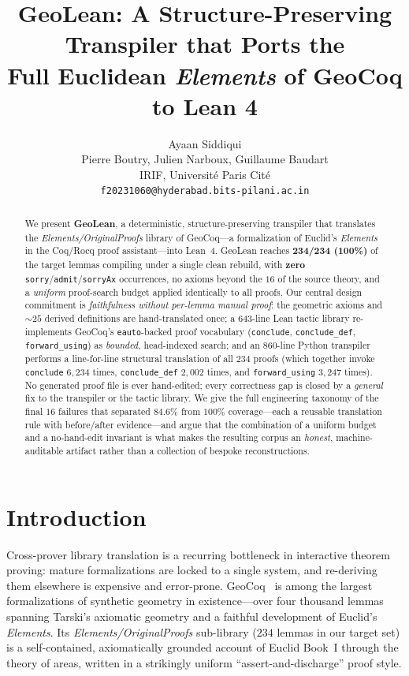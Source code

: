 \documentclass{article}
\title{GeoLean: A Structure-Preserving Transpiler that Ports the\\
Full Euclidean \emph{Elements} of GeoCoq to Lean 4}
\author{
  Ayaan Siddiqui \\
  Pierre Boutry, Julien Narboux, Guillaume Baudart \\
  IRIF, Universit\'e Paris Cit\'e \\
  \texttt{f20231060@hyderabad.bits-pilani.ac.in}
}
\begin{document}
\maketitle

\begin{abstract}
We present \textbf{GeoLean}, a deterministic, structure-preserving transpiler that translates
the \emph{Elements/OriginalProofs} library of GeoCoq---a formalization of Euclid's
\emph{Elements} in the Coq/Rocq proof assistant---into Lean~4. GeoLean reaches
\textbf{234/234 (100\%)} of the target lemmas compiling under a single clean rebuild, with
\textbf{zero} \texttt{sorry}/\texttt{admit}/\texttt{sorryAx} occurrences, no axioms beyond the
$16$ of the source theory, and a \emph{uniform} proof-search budget applied identically to all
proofs. Our central design commitment is \emph{faithfulness without per-lemma manual proof}:
the geometric axioms and ${\sim}25$ derived definitions are hand-translated once; a 643-line
Lean tactic library re-implements GeoCoq's \texttt{eauto}-backed proof vocabulary
(\texttt{conclude}, \texttt{conclude\_def}, \texttt{forward\_using}) as \emph{bounded},
head-indexed search; and an 860-line Python transpiler performs a line-for-line structural
translation of all $234$ proofs (which together invoke \texttt{conclude} $6{,}234$ times,
\texttt{conclude\_def} $2{,}002$ times, and \texttt{forward\_using} $3{,}247$ times). No
generated proof file is ever hand-edited; every correctness gap is closed by a \emph{general}
fix to the transpiler or the tactic library. We give the full engineering taxonomy of the
final $16$ failures that separated $84.6\%$ from $100\%$ coverage---each a reusable
translation rule with before/after evidence---and argue that the combination of a uniform
budget and a no-hand-edit invariant is what makes the resulting corpus an \emph{honest},
machine-auditable artifact rather than a collection of bespoke reconstructions.
\end{abstract}

\section{Introduction}

Cross-prover library translation is a recurring bottleneck in interactive theorem proving:
mature formalizations are locked to a single system, and re-deriving them elsewhere is
expensive and error-prone. GeoCoq~\citep{geocoq} is among the largest formalizations of
synthetic geometry in existence---over four thousand lemmas spanning Tarski's axiomatic
geometry and a faithful development of Euclid's \emph{Elements}. Its
\emph{Elements/OriginalProofs} sub-library ($234$ lemmas in our target set) is a
self-contained, axiomatically grounded account of Euclid Book~I through the theory of areas,
written in a strikingly uniform ``assert-and-discharge'' proof style.
\end{document}
